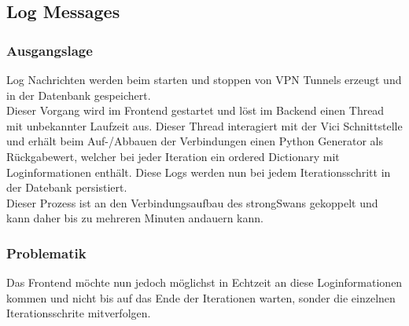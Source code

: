 \newpage
\subsection{Log Messages}
\subsubsection{Ausgangslage}
Log Nachrichten werden beim  starten und stoppen von VPN Tunnels erzeugt und in der Datenbank gespeichert. \\
Dieser Vorgang wird im Frontend gestartet und löst im Backend einen Thread mit unbekannter Laufzeit aus. Dieser Thread interagiert mit der Vici Schnittstelle und erhält beim Auf-/Abbauen der Verbindungen einen Python Generator als Rückgabewert, welcher bei jeder Iteration ein ordered Dictionary mit Loginformationen enthält. Diese Logs werden nun bei jedem Iterationsschritt in der Datebank persistiert.\\ Dieser Prozess ist an den Verbindungsaufbau des strongSwans gekoppelt und kann daher bis zu mehreren Minuten andauern kann.

\subsubsection{Problematik}
Das Frontend möchte nun jedoch möglichst in Echtzeit an diese Loginformationen kommen und nicht bis auf das Ende der Iterationen warten, sonder die einzelnen Iterationsschrite mitverfolgen.

